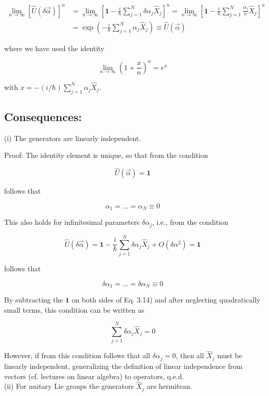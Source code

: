 \documentclass[10pt, letterpaper]{article}
\begin{document}
$$
\begin{aligned}
\lim _{n \rightarrow \infty}[\hat{U}(\delta \vec{\alpha})]^{n} & =\lim _{n \rightarrow \infty}\left[\mathbf{1}-\frac{i}{\hbar} \sum_{j=1}^{N} \delta \alpha_{j} \hat{X}_{j}\right]^{n}=\lim _{n \rightarrow \infty}\left[\mathbf{1}-\frac{i}{\hbar} \sum_{j=1}^{N} \frac{\alpha_{j}}{n} \hat{X}_{j}\right]^{n} \\
& =\exp \left(-\frac{i}{\hbar} \sum_{j=1}^{N} \alpha_{j} \hat{X}_{j}\right) \equiv \hat{U}(\vec{\alpha})
\end{aligned}
$$

where we have used the identity

$$
\lim _{n \rightarrow \infty}\left(1+\frac{x}{n}\right)^{n}=e^{x}
$$

with $x=-(i / \hbar) \sum_{j=1}^{N} \alpha_{j} \hat{X}_{j}$.



\subsection{Consequences:}
(i) The generators are linearly independent.

Proof: The identity element is unique, so that from the condition

$$
\hat{U}(\vec{\alpha})=\mathbf{1}
$$

follows that

$$
\alpha_{1}=\ldots=\alpha_{N} \equiv 0
$$

This also holds for infinitesimal parameters $\delta \alpha_{j}$, i.e., from the condition

$$
\hat{U}(\delta \vec{\alpha})=\mathbf{1}-\frac{i}{\hbar} \sum_{j=1}^{N} \delta \alpha_{j} \hat{X}_{j}+O\left(\delta \alpha^{2}\right)=\mathbf{1}
$$

follows that

$$
\delta \alpha_{1}=\ldots=\delta \alpha_{N} \equiv 0
$$

By subtracting the $\mathbf{1}$ on both sides of Eq. 3.14) and after neglecting quadratically small terms, this condition can be written as

$$
\sum_{j=1}^{N} \delta \alpha_{j} \hat{X}_{j}=0
$$

However, if from this condition follows that all $\delta \alpha_{j}=0$, then all $\hat{X}_{j}$ must be linearly independent, generalizing the definition of linear independence from vectors (cf. lectures on linear algebra) to operators, q.e.d.\\
(ii) For unitary Lie groups the generators $\hat{X}_{j}$ are hermitean.
\end{document}
